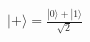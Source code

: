 \documentclass[preview]{standalone}
\begin{document}
\begin{align*}
|+\rangle = \frac{|0\rangle + |1\rangle}{\sqrt{2}}
\end{align*}
\end{document}

